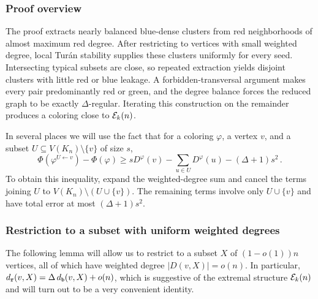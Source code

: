 \subsubsection{Proof overview}
The proof extracts nearly balanced blue-dense clusters from red neighborhoods of almost maximum red degree. After restricting to vertices with small weighted degree, local Tur\'an stability supplies these clusters uniformly for every seed. Intersecting typical subsets are close, so repeated extraction yields disjoint clusters with little red or blue leakage. A forbidden-transversal argument makes every pair predominantly red or green, and the degree balance forces the reduced graph to be exactly $\Delta$-regular. Iterating this construction on the remainder produces a coloring close to ${\mathcal E}_k(n)$.

In several places we will use the fact that for a coloring $\varphi$, a vertex $v$, and a subset $U\subseteq V(K_n)\setminus\{v\}$ of size $s$,
\begin{equation}
\Phi(\varphi^{U\gets v})-\Phi(\varphi)\geq sD^\varphi(v)-\sum_{u\in U}D^\varphi(u)-(\Delta+1)s^2\,. \label{eqn:phi-clone-ineq}
\end{equation}
To obtain this inequality, expand the weighted-degree sum and cancel the terms joining $U$ to $V(K_n)\setminus(U\cup\{v\})$. The remaining terms involve only $U\cup\{v\}$ and have total error at most $(\Delta+1)s^2$.

\subsubsection{Restriction to a subset with uniform weighted degrees}
The following lemma will allow us to restrict to a subset $X$ of $(1-o(1))n$ vertices, all of which have weighted degree $|D(v,X)|=o(n)$. In particular, $d_{\normalfont\texttt r}(v,X)=\Delta\,d_{\normalfont\texttt b}(v,X)+o(n)$, which is suggestive of the extremal structure ${\mathcal E}_k(n)$ and will turn out to be a very convenient identity.

